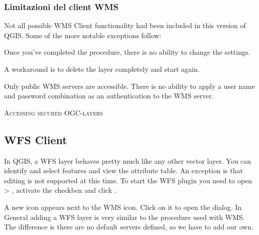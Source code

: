 \subsubsection{Limitazioni del client WMS}\label{sec:ogc-wms-limits}

Not all possible WMS Client functionality had been included in this version of QGIS.
Some of the more notable exceptions follow:


Once you've completed the 
procedure, there is no ability to change the settings.

A workaround is to delete the layer completely and start again.


Only public WMS servers are accessible.
There is no ability to apply a user name and password combination
as an authentication to the WMS server.

\begin{Tip}[ht]\caption{\textsc{Accessing secured OGC-layers}}
\end{Tip}


\subsection{WFS Client}

In QGIS, a WFS layer behaves pretty much like any other vector layer. You 
can identify and select features and view the attribute table. An exception 
is that editing is not supported at this time. To start the WFS plugin you 
need to open  > , 
activate the  checkbox and click . 

A new  icon appears next 
to the WMS icon. Click on it to open the dialog. In General adding a WFS 
layer is very similar to the procedure used with WMS. The difference is 
there are no default servers defined, so we have to add our own.


